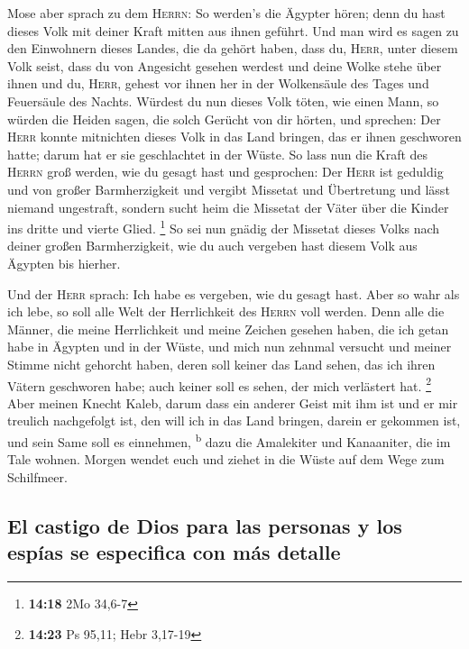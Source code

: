  Mose aber sprach zu dem \textsc{Herrn}: So werden's die
Ägypter hören; denn du hast dieses Volk mit deiner Kraft mitten aus
ihnen geführt.  Und man wird es sagen zu den Einwohnern
dieses Landes, die da gehört haben, dass du, \textsc{Herr}, unter diesem
Volk seist, dass du von Angesicht gesehen werdest und deine Wolke stehe
über ihnen und du, \textsc{Herr}, gehest vor ihnen her in der
Wolkensäule des Tages und Feuersäule des Nachts.  Würdest
du nun dieses Volk töten, wie einen Mann, so würden die Heiden sagen,
die solch Gerücht von dir hörten, und sprechen:  Der
\textsc{Herr} konnte mitnichten dieses Volk in das Land bringen, das er
ihnen geschworen hatte; darum hat er sie geschlachtet in der Wüste.
 So lass nun die Kraft des \textsc{Herrn} groß werden,
wie du gesagt hast und gesprochen:  Der \textsc{Herr} ist
geduldig und von großer Barmherzigkeit und vergibt Missetat und
Übertretung und lässt niemand ungestraft, sondern sucht heim die
Missetat der Väter über die Kinder ins dritte und vierte Glied.
\footnote{\textbf{14:18} 2Mo 34,6-7}  So sei nun gnädig
der Missetat dieses Volks nach deiner großen Barmherzigkeit, wie du auch
vergeben hast diesem Volk aus Ägypten bis hierher.

 Und der \textsc{Herr} sprach: Ich habe es vergeben, wie
du gesagt hast.  Aber so wahr als ich lebe, so soll alle
Welt der Herrlichkeit des \textsc{Herrn} voll werden. 
Denn alle die Männer, die meine Herrlichkeit und meine Zeichen gesehen
haben, die ich getan habe in Ägypten und in der Wüste, und mich nun
zehnmal versucht und meiner Stimme nicht gehorcht haben, 
deren soll keiner das Land sehen, das ich ihren Vätern geschworen habe;
auch keiner soll es sehen, der mich verlästert hat. \footnote{\textbf{14:23}
  Ps 95,11; Hebr 3,17-19}  Aber meinen Knecht Kaleb,
darum dass ein anderer Geist mit ihm ist und er mir treulich nachgefolgt
ist, den will ich in das Land bringen, darein er gekommen ist, und sein
Same soll es einnehmen, \textsuperscript{b}  dazu die
Amalekiter und Kanaaniter, die im Tale wohnen. Morgen wendet euch und
ziehet in die Wüste auf dem Wege zum Schilfmeer.

\hypertarget{el-castigo-de-dios-para-las-personas-y-los-espuxedas-se-especifica-con-muxe1s-detalle}{%
\subsection{El castigo de Dios para las personas y los espías se
especifica con más
detalle}\label{el-castigo-de-dios-para-las-personas-y-los-espuxedas-se-especifica-con-muxe1s-detalle}}

